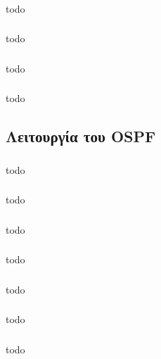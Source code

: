 \documentclass[a4paper, 12pt]{article}
\begin{document}
		\subsubsection{}
			todo

		\subsubsection{}
			todo

		\subsubsection{}
			todo

		\subsubsection{}
			todo

	\subsection{Λειτουργία του OSPF}

		\subsubsection{}
			todo

		\subsubsection{}
			todo

		\subsubsection{}
			todo

		\subsubsection{}
			todo

		\subsubsection{}
			todo

		\subsubsection{}
			todo

		\subsubsection{}
			todo
\end{document}
